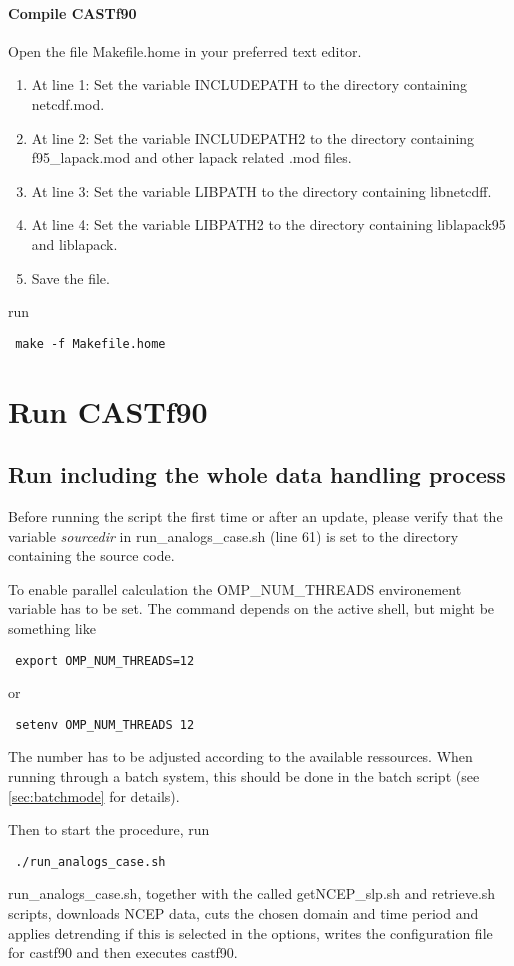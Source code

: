 \documentclass[11p,a4paper]{article}
\begin{document}
\paragraph{Compile CASTf90}
Open the file Makefile.home in your preferred text editor.
\begin{enumerate}
\item At line 1: Set the variable INCLUDEPATH to the directory containing netcdf.mod.
\item At line 2: Set the variable INCLUDEPATH2 to the directory containing f95\_lapack.mod and other lapack related .mod files.
\item At line 3: Set the variable LIBPATH to the directory containing libnetcdff.
\item At line 4: Set the variable LIBPATH2 to the directory containing liblapack95 and liblapack.
\item Save the file.
\end{enumerate}
run
\begin{verbatim}
 make -f Makefile.home
\end{verbatim}

\section{Run CASTf90}
\subsection{Run including the whole data handling process}
Before running the script the first time or after an update, please verify that the variable \textit{sourcedir} in run\_analogs\_case.sh (line 61) is set to the directory containing the source code.

To enable parallel calculation the OMP\_NUM\_THREADS environement variable has to be set. The command depends on the active shell, but might be something like 
\begin{verbatim}
 export OMP_NUM_THREADS=12
\end{verbatim}
or 
\begin{verbatim}
 setenv OMP_NUM_THREADS 12
\end{verbatim}
The number has to be adjusted according to the available ressources.
When running through a batch system, this should be done in the batch script (see  \autoref{sec:batchmode} for details).

Then to start the procedure, run
\begin{verbatim}
 ./run_analogs_case.sh
\end{verbatim}
run\_analogs\_case.sh, together with the called getNCEP\_slp.sh 
and retrieve.sh scripts, downloads NCEP data, cuts the chosen domain and time period and applies detrending if this is selected in the options, writes the configuration file for castf90 and then executes castf90.
\end{document}
